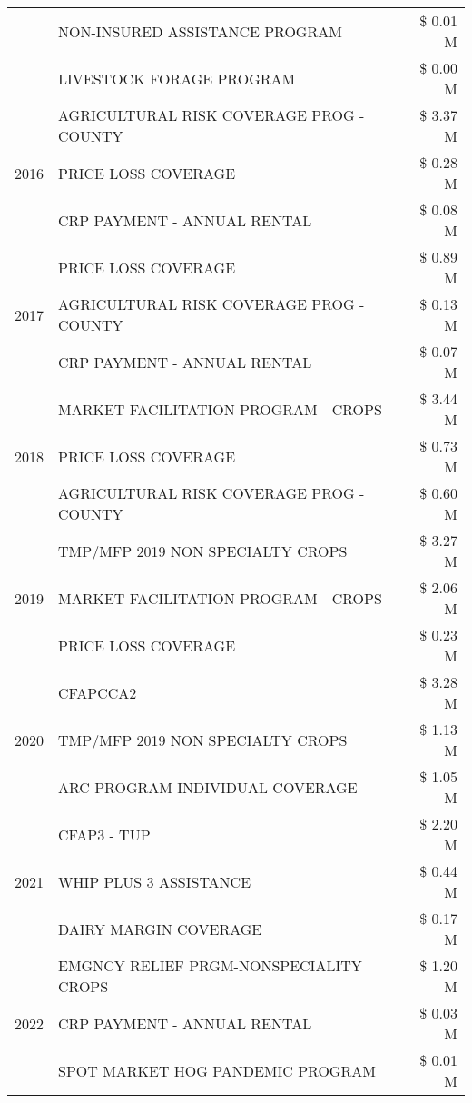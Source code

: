 \begin{tabular}{llr}
 & NON-INSURED ASSISTANCE PROGRAM & \$ 0.01 M \\
 & LIVESTOCK FORAGE PROGRAM & \$ 0.00 M \\
\cline{1-3}
\multirow[t]{3}{*}{2016} & AGRICULTURAL RISK COVERAGE PROG - COUNTY & \$ 3.37 M \\
 & PRICE LOSS COVERAGE & \$ 0.28 M \\
 & CRP PAYMENT - ANNUAL RENTAL & \$ 0.08 M \\
\cline{1-3}
\multirow[t]{3}{*}{2017} & PRICE LOSS COVERAGE & \$ 0.89 M \\
 & AGRICULTURAL RISK COVERAGE PROG - COUNTY & \$ 0.13 M \\
 & CRP PAYMENT - ANNUAL RENTAL & \$ 0.07 M \\
\cline{1-3}
\multirow[t]{3}{*}{2018} & MARKET FACILITATION PROGRAM - CROPS & \$ 3.44 M \\
 & PRICE LOSS COVERAGE & \$ 0.73 M \\
 & AGRICULTURAL RISK COVERAGE PROG - COUNTY & \$ 0.60 M \\
\cline{1-3}
\multirow[t]{3}{*}{2019} & TMP/MFP 2019 NON SPECIALTY CROPS & \$ 3.27 M \\
 & MARKET FACILITATION PROGRAM - CROPS & \$ 2.06 M \\
 & PRICE LOSS COVERAGE & \$ 0.23 M \\
\cline{1-3}
\multirow[t]{3}{*}{2020} & CFAPCCA2 & \$ 3.28 M \\
 & TMP/MFP 2019 NON SPECIALTY CROPS & \$ 1.13 M \\
 & ARC PROGRAM INDIVIDUAL COVERAGE & \$ 1.05 M \\
\cline{1-3}
\multirow[t]{3}{*}{2021} & CFAP3 - TUP & \$ 2.20 M \\
 & WHIP PLUS 3 ASSISTANCE & \$ 0.44 M \\
 & DAIRY MARGIN COVERAGE & \$ 0.17 M \\
\cline{1-3}
\multirow[t]{3}{*}{2022} & EMGNCY RELIEF PRGM-NONSPECIALITY CROPS & \$ 1.20 M \\
 & CRP PAYMENT - ANNUAL RENTAL & \$ 0.03 M \\
 & SPOT MARKET HOG PANDEMIC PROGRAM & \$ 0.01 M \\
\cline{1-3}
\bottomrule
\end{tabular}
